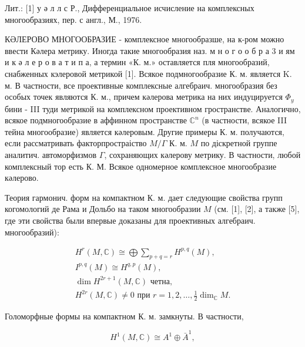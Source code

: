\documentclass[10pt]{article}
\begin{document}
Лит.: [1] у ә л л с Р., Дифференциальное исчисление на комплексных многообразиях, пер. с англ., М., 1976.



КӘЛЕРОВО МНОГООБРАЗИЕ - комплексное многообразше, на к-ром можно ввести Кәлера метрику. Иногда такие многообразия наз. м н о г о о б р а 3 и ям и к ә л е р о в а т и п а, а термин «К. м.» оставляется пля многообразий, снабженных кэлеровой метрикой [1]. Всякое подмногообразие К. м. является K. м. В частности, все проективные комплексные алгебраич. многообразия без особых точек являются К. м., причем кәлерова метрика на них индуцируется $\Phi_{y}$ бини - III туди метрикой на комплексном проективном гространстве. Аналогично, всякое подмногообразие в аффинном пространстве $\mathbb{C}^{n}$ (в частности, всякое III тейна многообразие) является кәлеровым. Другие примеры К. м. получаются, если рассматривать факторпростраіство $M / \Gamma$ К. м. $M$ по діскретной группе аналитич. автоморфизмов $\Gamma$, сохраняющих кәлерову метрику. В частности, любой комплексный тор есть К. М. Всякое одномерное комплексное многообразие кәлерово.



Теория гармонич. форм на компактном К. м. дает следующие свойства групп когомологий де Рама и Дольбо на таком многообразии $M$ (см. [1], [2], а также [5], где эти свойства были впервые доказаны для проективных алгебраич. многообразий):



\[

\begin{gathered}

H^{r}(M, \mathbb{C}) \cong \bigoplus \sum_{p+q=r} H^{p, q}(M), \\

I^{p, q}(M) \cong H^{q, p}(M), \\

\operatorname{dim} H^{2 r+1}(M, \mathbb{C}) \text { четна, } \\

H^{2 r}(M, \mathbb{C}) \neq 0 \text { при } r=1,2, \ldots, \frac{1}{2} \operatorname{dim}_{\mathbb{C}} M .

\end{gathered}

\]



Голоморфные формы на компактном К. м. замкнуты. В частности,



\[

H^{1}(M, \mathbb{C}) \cong A^{1} \oplus \bar{A}^{1},

\]
\end{document}

